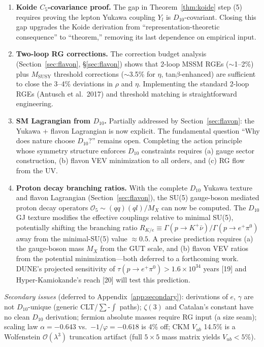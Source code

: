 \documentclass[11pt,a4paper]{article}
\begin{document}
\begin{enumerate}
\item \textbf{Koide $C_5$-covariance proof.} The gap in Theorem~\ref{thm:koide} step (5) requires proving the lepton Yukawa coupling $Y_l$ is $D_{10}$-covariant. Closing this gap upgrades the Koide derivation from ``representation-theoretic consequence'' to ``theorem,'' removing its last dependence on empirical input.

\item \textbf{Two-loop RG corrections.} The correction budget analysis (Section~\ref{sec:flavon}, \S\ref{sec:flavon}) shows that 2-loop MSSM RGEs ($\sim$1--2\%) plus $M_{\text{SUSY}}$ threshold corrections ($\sim$3.5\% for $\eta$, tan$\beta$-enhanced) are sufficient to close the 3--4\% deviations in $\rho$ and $\eta$. Implementing the standard 2-loop RGEs (Antusch et al.\ 2017) and threshold matching is straightforward engineering.

\item \textbf{SM Lagrangian from $D_{10}$.} Partially addressed by Section~\ref{sec:flavon}: the Yukawa + flavon Lagrangian is now explicit. The fundamental question ``Why does nature choose $D_{10}$?'' remains open. Completing the action principle whose symmetry structure enforces $D_{10}$ constraints requires (a) gauge sector construction, (b) flavon VEV minimization to all orders, and (c) RG flow from the UV.

\item \textbf{Proton decay branching ratios.} With the complete $D_{10}$ Yukawa texture and flavon Lagrangian (Section~\ref{sec:flavon}), the SU(5) gauge-boson mediated proton decay operators $\mathcal{O}_{5} \sim (qq)(ql)/M_X$ can now be computed. The $D_{10}$ GJ texture modifies the effective couplings relative to minimal SU(5), potentially shifting the branching ratio $R_{K/e} \equiv \Gamma(p \to K^+\bar{\nu})/\Gamma(p \to e^+\pi^0)$ away from the minimal-SU(5) value $\approx 0.5$. A precise prediction requires (a) the gauge-boson mass $M_X$ from the GUT scale, and (b) flavon VEV ratios from the potential minimization---both deferred to a forthcoming work. DUNE's projected sensitivity of $\tau(p \to e^+\pi^0) > 1.6 \times 10^{34}$ years [19] and Hyper-Kamiokande's reach [20] will test this prediction.
\end{enumerate}

\smallskip
\textit{Secondary issues} (deferred to Appendix~\ref{app:secondary}): derivations of $e$, $\gamma$ are not $D_{10}$-unique (generic CLT/$\sum$-$\int$ paths); $\zeta(3)$ and Catalan's constant have no clean $D_{10}$ derivation; fermion absolute masses require RG input (a size seam); scaling law $\alpha = -0.643$ vs.\ $-1/\varphi = -0.618$ is 4\% off; CKM $V_{ub}$ 14.5\% is a Wolfenstein $\mathcal{O}(\lambda^3)$ truncation artifact (full $5\times5$ mass matrix yields $V_{ub} < 5\%$).
\end{document}
